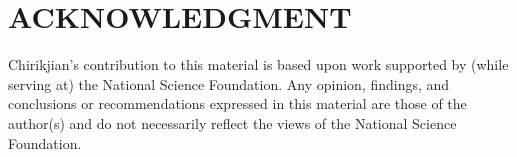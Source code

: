 \documentclass[letterpaper, 10 pt, conference]{ieeeconf}  %
\begin{document}

\addtolength{\textheight}{-12cm}   %








\section*{ACKNOWLEDGMENT}
{Chirikjian's contribution to this material is based upon work supported by (while serving at) the National Science Foundation.
Any opinion, findings, and conclusions or recommendations expressed in this material are those of the author(s)
and do not necessarily reflect the views of the National Science Foundation.}






%
%
\end{document}
